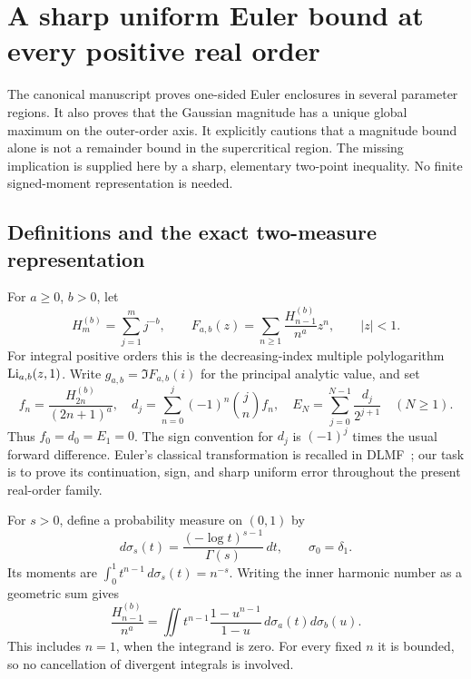 \section{A sharp uniform Euler bound at every positive real order}
\label{sec:euler}

The canonical manuscript proves one-sided Euler enclosures in several
parameter regions. It also proves that the Gaussian magnitude has a unique
global maximum on the outer-order axis. It explicitly cautions that a
magnitude bound alone is not a remainder bound in the supercritical
region. The missing implication is supplied here by a sharp, elementary
two-point inequality. No finite signed-moment representation is needed.

\subsection{Definitions and the exact two-measure representation}

For $a\geq0$, $b>0$, let
\[
 H_m^{(b)}=\sum_{j=1}^m j^{-b},\qquad
 F_{a,b}(z)=\sum_{n\geq1}\frac{H_{n-1}^{(b)}}{n^a}z^n,
 \qquad |z|<1.
\]
For integral positive orders this is the decreasing-index multiple
polylogarithm $\operatorname{Li}_{a,b}(z,1)$. Write
$g_{a,b}=\Im F_{a,b}(i)$ for the principal analytic value, and set
\begin{equation}\label{eq:euler-defs}
 f_n=\frac{H_{2n}^{(b)}}{(2n+1)^a},\quad
 d_j=\sum_{n=0}^j(-1)^n\binom jn f_n,\quad
 E_N=\sum_{j=0}^{N-1}\frac{d_j}{2^{j+1}}\quad(N\geq1).
\end{equation}
Thus $f_0=d_0=E_1=0$. The sign convention for $d_j$ is $(-1)^j$
times the usual forward difference. Euler's classical transformation
is recalled in DLMF~\cite{DLMFEuler}; our task is to prove its continuation,
sign, and sharp uniform error throughout the present real-order family.

For $s>0$, define a probability measure on $(0,1)$ by
\[
 d\sigma_s(t)=\frac{(-\log t)^{s-1}}{\Gamma(s)}\,dt,
 \qquad \sigma_0=\delta_1.
\]
Its moments are $\int_0^1t^{n-1}\,d\sigma_s(t)=n^{-s}$.
Writing the inner harmonic number as a geometric sum gives
\begin{equation}\label{eq:two-moment}
 \frac{H_{n-1}^{(b)}}{n^a}
 =\iint t^{n-1}\frac{1-u^{n-1}}{1-u}\,
                       d\sigma_a(t)d\sigma_b(u).
\end{equation}
This includes $n=1$, when the integrand is zero. For every fixed $n$
it is bounded, so no cancellation of divergent integrals is involved.

